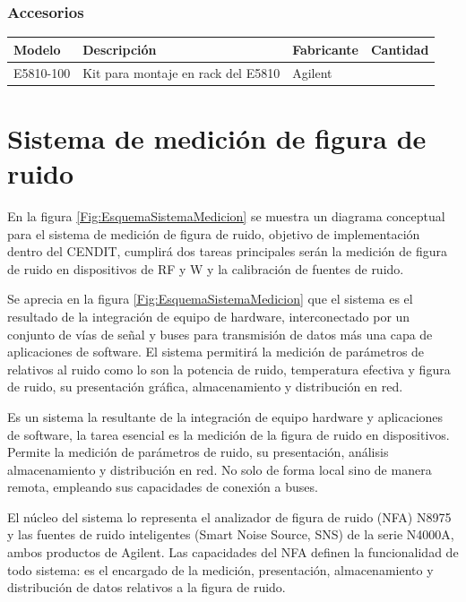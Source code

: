 \documentclass{article}
\begin{document}
	\subsubsection{Accesorios}
		\begin{flushleft}
			\tablefirsthead{}
			\tablehead{}
			\tabletail{}
			\tablelasttail{}
			\begin{supertabular}{|m{2.34cm}|m{6.997cm}|m{2.34cm}|m{2.34cm}|}
				\hline
				\centering Modelo &
				\centering Descripción &
				\centering Fabricante &
				\centering Cantidad\\\hline
				\centering E5810-100 &
				\centering Kit para montaje en rack del E5810 &
				\centering Agilent &
				\\\hline
			\end{supertabular}
		\end{flushleft}
	
	\clearpage
	\section{Sistema de medición de figura de ruido}
	En la figura \ref{Fig:EsquemaSistemaMedicion} se muestra un diagrama conceptual para el sistema de medición de figura de ruido, objetivo de implementación dentro del CENDIT, cumplirá dos tareas principales serán la medición de figura de ruido en dispositivos de RF y {\textmu}W y la calibración de fuentes de ruido.
	
	Se aprecia en la figura \ref{Fig:EsquemaSistemaMedicion} que el sistema es el resultado de la integración de equipo de hardware, interconectado por un conjunto de vías de señal y buses para transmisión de datos más una capa de aplicaciones de software. El sistema permitirá la medición de parámetros de relativos al ruido como lo son la potencia de ruido, temperatura efectiva y figura de ruido, su presentación gráfica, almacenamiento y distribución en red.
	
	Es un sistema la resultante de la integración de equipo hardware y aplicaciones de software, la tarea esencial es la	medición de la figura de ruido en dispositivos.  Permite la medición de parámetros de ruido, su presentación, análisis almacenamiento y distribución en red. No solo de forma local sino de manera remota, empleando sus capacidades de	conexión a buses.
	
	El núcleo del sistema lo representa el analizador de figura de ruido (NFA) N8975 y las fuentes de ruido inteligentes (Smart Noise Source, SNS) de la serie N4000A, ambos productos de Agilent. Las capacidades del NFA definen la funcionalidad de todo sistema: es el encargado de la medición, presentación, almacenamiento y distribución de datos relativos a la figura de ruido. 
	
\end{document}
